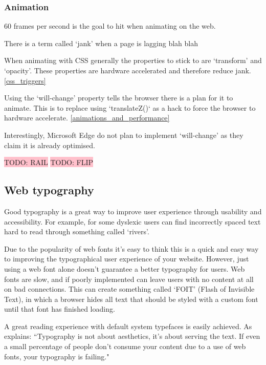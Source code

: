 \subsubsection{Animation} \label{l-r--animation}

60 frames per second is the goal to hit when animating on the web. %

There is a term called `jank' when a page is lagging blah blah %

When animating with CSS generally the properties to stick to are `transform' and `opacity'. These properties are hardware accelerated and therefore reduce jank. \ref{css_triggers}

Using the `will-change' property tells the browser there is a plan for it to animate. This is to replace using `translateZ()` as a hack to force the browser to hardware accelerate. \ref{animations_and_performance}

Interestingly, Microsoft Edge do not plan to implement `will-change' as they claim it is already optimised. \cite{will_change_edge}

\colorbox{pink}{TODO: RAIL} %
\colorbox{pink}{TODO: FLIP} %

\subsection{Web typography} \label{l-r--web-type}

Good typography is a great way to improve user experience through usability and accessibility. For example, for some dyslexic users can find incorrectly spaced text hard to read through something called `rivers'. \cite{dyslexia}

Due to the popularity of web fonts it's easy to think this is a quick and easy way to improving the typographical user experience of your website. However, just using a web font alone doesn't guarantee a better typography for users. Web fonts are slow, and if poorly implemented can leave users with no content at all on bad connections. This can create something called `FOIT' (Flash of Invisible Text), in which a browser hides all text that should be styled with a custom font until that font has finished loading. \cite{FOIT}

A great reading experience with default system typefaces is easily achieved. As \cite{against_webfonts} explains: ``Typography is not about aesthetics, it's about serving the text. If even a small percentage of people don't consume your content due to a use of web fonts, your typography is failing."

